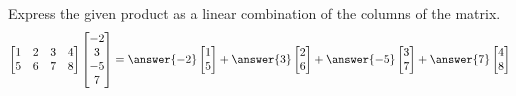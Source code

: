 \documentclass{ximera}
\begin{document}
\begin{problem}
Express the given product as a linear combination of the columns of the matrix.
$$\begin{bmatrix}1&2&3&4\\5&6&7&8\end{bmatrix}\begin{bmatrix}-2\\3\\-5\\7\end{bmatrix}=\answer{-2}\begin{bmatrix}1\\5\end{bmatrix}+\answer{3}\begin{bmatrix}2\\6\end{bmatrix}+\answer{-5}\begin{bmatrix}3\\7\end{bmatrix}+\answer{7}\begin{bmatrix}4\\8\end{bmatrix}$$
\end{problem}
\end{document}
